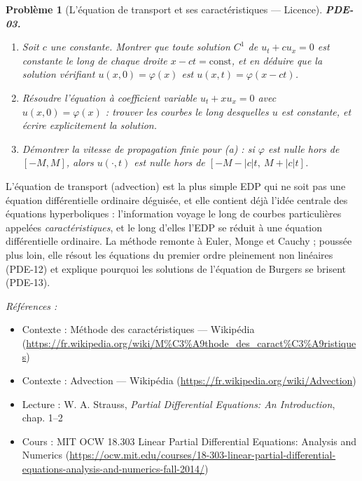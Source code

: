 \documentclass[11pt]{article}
\newtheorem{problem}{Problème}
\newenvironment{refs}{\par\small\noindent\emph{Références :}\begin{itemize}\setlength\itemsep{0pt}}{\end{itemize}\normalsize}
\begin{document}
\begin{problem}[{L'équation de transport et ses caractéristiques --- Licence}]
\textbf{PDE-03.} \begin{enumerate}
\item[(a)] Soit $c$ une constante. Montrer que toute solution
$C^1$ de $u_t + c u_x = 0$ est constante le long de chaque droite
$x - ct = \text{const}$, et en déduire que la solution vérifiant $u(x,0) = \varphi(x)$
est $u(x,t) = \varphi(x - ct)$.
\item[(b)] Résoudre l'équation à coefficient variable
$u_t + x u_x = 0$ avec $u(x,0) = \varphi(x)$ : trouver les courbes le long desquelles $u$
est constante, et écrire explicitement la solution.
\item[(c)] Démontrer la vitesse de propagation finie
pour (a) : si $\varphi$ est nulle hors de $[-M, M]$, alors $u(\cdot,t)$ est nulle
hors de $[-M - |c|t,\ M + |c|t]$.
\end{enumerate}

\end{problem}

\noindent L'équation de transport (advection) est la plus simple EDP qui ne soit pas une
équation différentielle ordinaire déguisée, et elle contient déjà l'idée centrale des équations
hyperboliques : l'information voyage le long de courbes particulières appelées
\textit{caractéristiques}, et le long d'elles l'EDP se réduit à une équation différentielle
ordinaire. La méthode remonte à Euler, Monge et Cauchy ; poussée plus loin, elle résout les
équations du premier ordre pleinement non linéaires (PDE-12) et explique pourquoi les solutions de
l'équation de Burgers se brisent (PDE-13).

\begin{refs}
\item Contexte : Méthode des caractéristiques --- Wikipédia (\url{https://fr.wikipedia.org/wiki/M%C3%A9thode_des_caract%C3%A9ristiques})
\item Contexte : Advection --- Wikipédia (\url{https://fr.wikipedia.org/wiki/Advection})
\item Lecture : W. A. Strauss, \textit{Partial Differential Equations: An Introduction}, chap. 1--2
\item Cours : MIT OCW 18.303 Linear Partial Differential Equations: Analysis and Numerics (\url{https://ocw.mit.edu/courses/18-303-linear-partial-differential-equations-analysis-and-numerics-fall-2014/})
\end{refs}

\bigskip
\end{document}

